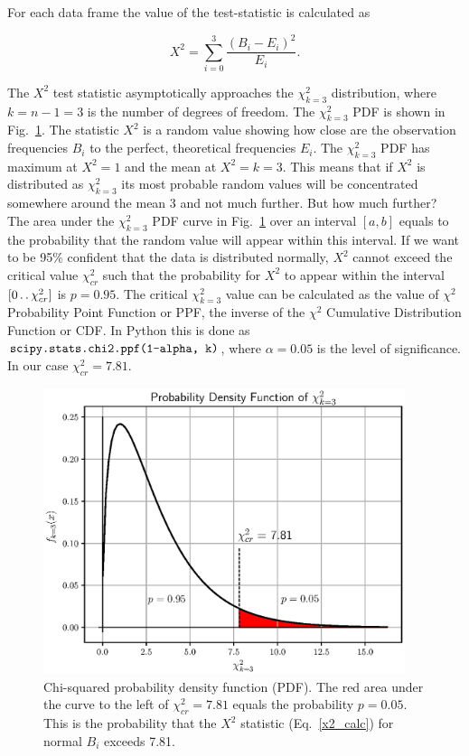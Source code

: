 \documentclass[letterpaper,twoside,12pt]{article}
\newcommand{\twodots}{\mathinner {\ldotp \ldotp}}
\begin{document}
For each data frame the value of the test-statistic is calculated as

\begin{equation}
  \label{x2_calc}
  X^2 = \sum_{i=0}^3 \frac{(B_i - E_i)^2}{E_i}.
\end{equation}


The $X^2$ test statistic asymptotically approaches the $\chi^2_{k=3}$ distribution, where $k = n - 1 = 3$ is the number of degrees of freedom. The $\chi^2_{k=3}$ PDF is shown in Fig.~\ref{chi2_pdf}. The statistic $X^2$ is a random value showing how close are the observation frequencies $B_i$ to the perfect, theoretical frequencies $E_i$. The $\chi^2_{k=3}$ PDF has maximum at $X^2=1$ and the mean at $X^2=k=3$. This means that if $X^2$ is distributed as $\chi^2_{k=3}$ its most probable random values will be concentrated somewhere around the mean 3 and not much further. But how much further? The area under the $\chi^2_{k=3}$ PDF curve in Fig.~\ref{chi2_pdf} over an interval $[a,b]$ equals to the probability that the random value will appear within this interval. If we want to be 95\% confident that the data is distributed normally, $X^2$ cannot exceed the critical value $\chi^2_{cr}$ such that the probability for $X^2$ to appear within the interval $[0 \twodots \chi^2_{cr}]$ is $p=0.95$. The critical $\chi^2_{k=3}$ value can be calculated as the value of $\chi^2$ Probability Point Function or PPF, the inverse of the $\chi^2$ Cumulative Distribution Function or CDF. In Python this is done as $\verb@scipy.stats.chi2.ppf(1-alpha, k)@$, where $\alpha = 0.05$ is the level of significance. In our case $\chi^2_{cr} = 7.81$. 

\begin{figure}[ht!]
  \begin{center}
  \includegraphics[width=25pc]{fig_chi2_pdf.eps}
  \caption{\small Chi-squared probability density function (PDF). The red area under the curve to the left of $\chi^2_{cr} = 7.81$ equals the probability $p=0.05$. This is the probability that the $X^2$ statistic (Eq.~\eqref{x2_calc}) for normal $B_i$ exceeds 7.81.}
  \label{chi2_pdf}
  \end{center}
\end{figure}
\end{document}
